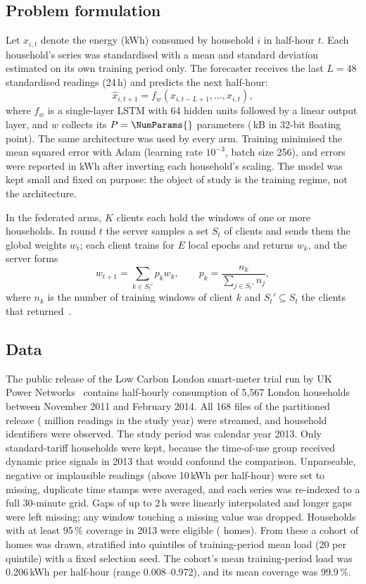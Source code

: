 \subsection{Problem formulation}
Let $x_{i,t}$ denote the energy (kWh) consumed by household $i$ in half-hour $t$. Each household's series was
standardised with a mean and standard deviation estimated on its own training period only. The forecaster receives the
last $L=48$ standardised readings (24\,h) and predicts the next half-hour:
\begin{equation}\label{eq:task}
\hat{x}_{i,t+1}=f_w\left(x_{i,t-L+1},\ldots,x_{i,t}\right),
\end{equation}
where $f_w$ is a single-layer LSTM with 64 hidden units followed by a linear output layer, and $w$ collects its
$P=\NumParams{}$ parameters (\PayloadKB{}\,kB in 32-bit floating point). The same architecture was used by every arm.
Training minimised the mean squared error with Adam (learning rate $10^{-3}$, batch size 256), and errors were reported
in kWh after inverting each household's scaling. The model was kept small and fixed on purpose: the object of study is
the training regime, not the architecture.

In the federated arms, $K$ clients each hold the windows of one or more households. In round $t$ the server samples a
set $S_t$ of clients and sends them the global weights $w_t$; each client trains for $E$ local epochs and returns
$w_k$, and the server forms
\begin{equation}\label{eq:fedavg}
w_{t+1}=\sum_{k\in S_t'}p_k w_k,\qquad p_k=\frac{n_k}{\sum_{j\in S_t'}n_j},
\end{equation}
where $n_k$ is the number of training windows of client $k$ and $S_t'\subseteq S_t$ the clients that
returned~\cite{mcmahan2017fedavg}.

\subsection{Data}
The public release of the Low Carbon London smart-meter trial run by UK Power Networks~\cite{ukpn2015lcl} contains
half-hourly consumption of 5{,}567 London households between November 2011 and February 2014. All 168 files of the
partitioned release (\RowsInPeriod{} million readings in the study year) were streamed, and \HouseholdsSeen{} household
identifiers were observed. The study period was calendar year 2013. Only standard-tariff households were kept, because
the time-of-use group received dynamic price signals in 2013 that would confound the comparison. Unparseable, negative
or implausible readings (above 10\,kWh per half-hour) were set to missing, duplicate time stamps were averaged, and each
series was re-indexed to a full 30-minute grid. Gaps of up to 2\,h were linearly interpolated and longer gaps were left
missing; any window touching a missing value was dropped. Households with at least 95\,\% coverage in 2013 were
eligible (\HouseholdsEligible{} homes). From these a cohort of \NumHouseholds{} homes was drawn, stratified into
quintiles of training-period mean load (20 per quintile) with a fixed selection seed. The cohort's mean training-period
load was 0.206\,kWh per half-hour (range 0.008--0.972), and its mean coverage was 99.9\,\%.

